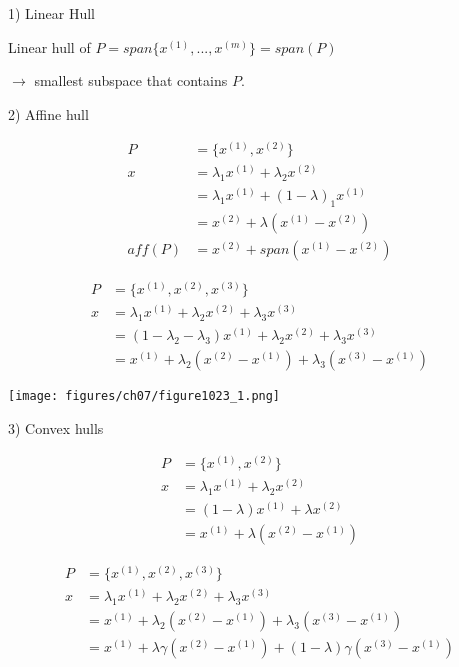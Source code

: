 1) Linear Hull

Linear hull of $P = span\{x^{(1)},...,x^{(m)} \} =span(P)$

$\rightarrow$ smallest subspace that contains $P$.

2) Affine hull

\begin{align*}
P &= \{x^{(1)}, x^{(2)} \}\\
x &= \lambda_1x^{(1)} + \lambda_2x^{(2)}\\
&= \lambda_1x^{(1)} + (1-\lambda)_1x^{(1)}\\
&= x^{(2)} + \lambda(x^{(1)} - x^{(2)})\\
aff(P) &= x^{(2)} + span(x^{(1)} - x^{(2)})
\end{align*}

\begin{align*}
P &= \{x^{(1)}, x^{(2)}, x^{(3)} \}\\
x &= \lambda_1x^{(1)} + \lambda_2x^{(2)} + \lambda_3x^{(3)}\\
&= (1 - \lambda_2 - \lambda_3)x^{(1)} + \lambda_2x^{(2)} + \lambda_3x^{(3)}\\
&= x^{(1)} + \lambda_2(x^{(2)} - x^{(1)}) + \lambda_3(x^{(3)} - x^{(1)})
\end{align*}

\begin{marginfigure}
	\centering
	\texttt{[image: figures/ch07/figure1023\_1.png]}
\end{marginfigure}

3) Convex hulls

\begin{align*}
P &= \{x^{(1)},  x^{(2)}\}\\
x &= \lambda_1x^{(1)} + \lambda_2x^{(2)}\\
&= (1-\lambda)x^{(1)} + \lambda x^{(2)}\\
&= x^{(1)} + \lambda(x^{(2)} - x^{(1)})
\end{align*}

\begin{align*}
P &= \{x^{(1)},  x^{(2)}, x^{(3)} \}\\
x &= \lambda_1x^{(1)} + \lambda_2x^{(2)} + \lambda_3x^{(3)}\\
&= x^{(1)} + \lambda_2(x^{(2)} - x^{(1)}) + \lambda_3(x^{(3)} - x^{(1)})\\
&= x^{(1)} + \lambda \gamma(x^{(2)} - x^{(1)}) + (1 - \lambda)\gamma(x^{(3)} - x^{(1)})
\end{align*}


